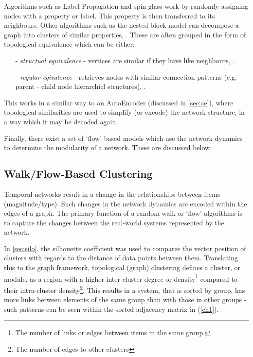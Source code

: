 Algorithms such as Label Propagation \citep{labelprop} and spin-glass \citep{spinglass} work by randomly assigning nodes with a property or label. This property is then transferred to its neighbours. Other algorithms such as the nested block model can decompose a graph into clusters of similar properties, \citep{communitygraph}. These are often grouped in the form of topological equivalence which can be either:
\begin{itemize}
    \item[-]\textit{structual equivalence} - vertices are similar if they have like neighbours, \citep{strueq}.
    \item[-]\textit{regular eqivalence} - retrieves nodes with similar connection patterns (e.g. parent - child node hierarchicl structures), \citep{regequiv}.
\end{itemize}
This works in a similar way to an AutoEncoder (discussed in \autoref{sec:ae}), where topological similarities are used to simplify (or encode) the network structure, in a way which it may be decoded again.

Finally, there exist a set of `flow' based models which use the network dynamics to determine the modularity of a network. These are discussed below.

\subsection{Walk/Flow-Based Clustering}
Temporal networks result in a change in the relationships between items (magnitude/type). Such changes in the network dynamics are encoded within the edges of a graph. The primary function of a random walk or `flow' algorithms is to capture the changes between the real-world systems represented by the network.

In \autoref{sec:silo}, the silhouette coefficient was used to compares the vector position of clusters with regards to the distance of data points between them. Translating this to the graph framework, topological (graph) clustering defines a cluster, or module, as a region with a higher inter-cluster degree or density\footnote{The number of links or edges between items in the same group.} compared to their intra-cluster density\footnote{The number of edges to other clusters}. This results in a system, that is sorted by group, has more links between elements of the same group than with those in other groups - such patterns can be seen within the sorted adjacency matrix in (\autoref{ch1}).


